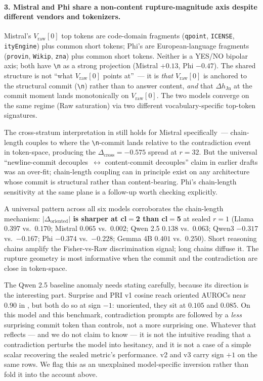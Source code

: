 \documentclass[10pt, letterpaper]{article}
\renewcommand{\dh}{\Delta h}
\newcommand{\Doriented}{\Delta_{\text{oriented}}}
\newcommand{\Dcross}{\Delta_{\text{cross}}}
\begin{document}
\paragraph{3. Mistral and Phi share a non-content rupture-magnitude
axis despite different vendors and tokenizers.} Mistral's
$V_\text{raw}[0]$ top tokens are code-domain fragments
(\texttt{qpoint}, \texttt{ICENSE}, \texttt{ityEngine}) plus common
short tokens; Phi's are European-language fragments (\texttt{provin},
\texttt{Wikip}, \texttt{zna}) plus common short tokens. Neither is
a YES/NO bipolar axis; both have \texttt{\textbackslash n} as a strong
projection (Mistral $+0.13$, Phi $-0.47$). The shared structure is not
``what $V_\text{raw}[0]$ points at''~--- it is \emph{that}
$V_\text{raw}[0]$ is anchored to the structural commit
(\texttt{\textbackslash n}) rather than to answer content,
\emph{and} that $\dh_\text{Jn}$ at the commit moment lands monotonically
on $V_\text{raw}[0]$. The two models converge on the same regime (Raw
saturation) via two different vocabulary-specific top-token signatures.

The cross-stratum interpretation in
 still holds for Mistral
specifically~--- chain-length couples to where the
\texttt{\textbackslash n}-commit lands relative to the
contradiction event in token-space, producing the
$\Dcross = -0.575$ spread at $r=32$. But the universal
``newline-commit decouples~$\leftrightarrow$ content-commit decouples''
claim in earlier drafts was an over-fit; chain-length coupling can in
principle exist on any architecture whose commit is structural rather
than content-bearing. Phi's chain-length sensitivity at the same plane
is a follow-up worth checking explicitly.

A universal pattern across all six models corroborates the
chain-length mechanism: \textbf{$|\Doriented|$ is sharper at cl$=$2
than cl$=$5} at sealed $r=1$ (Llama $0.397$ vs.\ $0.170$; Mistral
$0.065$ vs.\ $0.002$; Qwen 2.5 $0.138$ vs.\ $0.063$; Qwen3 $-0.317$
vs.\ $-0.167$; Phi $-0.374$ vs.\ $-0.228$; Gemma 4B $0.401$ vs.\
$0.250$). Short reasoning chains amplify the Fisher-vs-Raw
discrimination signal; long chains diffuse it. The rupture geometry is
most informative when the commit and the contradiction are close in
token-space.

The Qwen 2.5 baseline anomaly needs stating carefully, because its
direction is the interesting part. Surprise and PRI v1 cosine reach
oriented AUROCs near $0.90$ in \Cref{tab:baselines}, but both do so at
sign $-1$: unoriented, they sit at $0.105$ and $0.085$. On this model
and this benchmark, contradiction prompts are followed by a
\emph{less} surprising commit token than controls, not a more
surprising one. Whatever that reflects --- and we do not claim to know
--- it is not the intuitive reading that a contradiction perturbs the
model into hesitancy, and it is not a case of a simple scalar
recovering the sealed metric's performance. v2 and v3 carry sign $+1$
on the same rows. We flag this as an unexplained model-specific
inversion rather than fold it into the account above.
\end{document}
